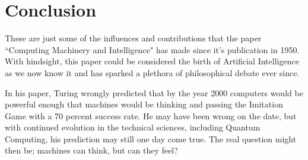 \documentclass{scrartcl}
\begin{document}
\section{Conclusion}
These are just some of the influences and contributions that the paper \textquotedblleft Computing Machinery and Intelligence" has made since it's publication in 1950. With hindsight, this paper could be considered the birth of Artificial Intelligence as we now know it and has sparked a plethora of philosophical debate ever since. \par
In his paper, Turing wrongly predicted that by the year 2000 computers would be powerful enough that machines would be thinking and passing the Imitation Game with a 70 percent success rate. He may have been wrong on the date, but with continued evolution in the technical sciences, including Quantum Computing, his prediction may still one day come true. The real question might then be; machines can think, but can they feel?









\end{document}
